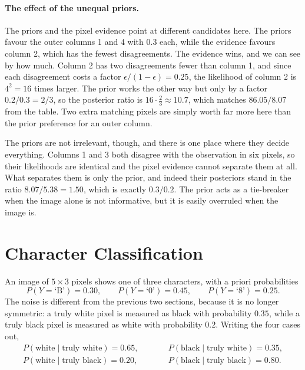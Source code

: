 \documentclass[11pt]{article}
\begin{document}
\paragraph{The effect of the unequal priors.}
The priors and the pixel evidence point at different candidates here. The
priors favour the outer columns 1 and 4 with $0.3$ each, while the evidence
favours column 2, which has the fewest disagreements. The evidence wins, and
we can see by how much. Column 2 has two disagreements fewer than column 1,
and since each disagreement costs a factor $\epsilon/(1-\epsilon) = 0.25$, the
likelihood of column 2 is $4^2 = 16$ times larger. The prior works the other
way but only by a factor $0.2/0.3 = 2/3$, so the posterior ratio is
$16 \cdot \tfrac{2}{3} \approx 10.7$, which matches
$86.05/8.07$ from the table. Two extra matching pixels are simply worth far
more here than the prior preference for an outer column.

The priors are not irrelevant, though, and there is one place where they
decide everything. Columns 1 and 3 both disagree with the observation in six
pixels, so their likelihoods are identical and the pixel evidence cannot
separate them at all. What separates them is only the prior, and indeed their
posteriors stand in the ratio $8.07/5.38 = 1.50$, which is exactly
$0.3/0.2$. The prior acts as a tie-breaker when the image alone is not
informative, but it is easily overruled when the image is.



\section{Character Classification}

An image of $5\times3$ pixels shows one of three characters, with a priori
probabilities
\[
    P(Y=\text{`B'}) = 0.30, \qquad P(Y=\text{`0'}) = 0.45,
    \qquad P(Y=\text{`8'}) = 0.25 .
\]
The noise is different from the previous two sections, because it is no longer
symmetric: a truly white pixel is measured as black with probability $0.35$,
while a truly black pixel is measured as white with probability $0.2$. Writing
the four cases out,
\[
    \begin{array}{lcl}
        P(\text{white} \mid \text{truly white}) = 0.65, & \qquad &
        P(\text{black} \mid \text{truly white}) = 0.35, \\[2pt]
        P(\text{white} \mid \text{truly black}) = 0.20, & \qquad &
        P(\text{black} \mid \text{truly black}) = 0.80 .
    \end{array}
\]
\end{document}
